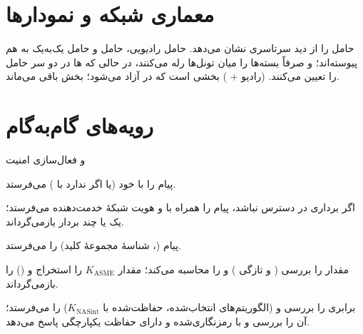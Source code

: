 \documentclass[11pt,a4paper]{article}
\begin{document}
\section{معماری شبکه و نمودارها}
 حامل را از دید سرتاسری نشان می‌دهد. حامل رادیویی، حامل  و حامل  یک‌به‌یک به هم
پیوسته‌اند؛  و  صرفاً بسته‌ها را میان تونل‌ها رله می‌کنند، در حالی که ها در دو سر حامل را تعیین
می‌کنند.  (رادیو + ) بخشی است که در  آزاد می‌شود؛ بخش  باقی می‌ماند.

\begin{acnfigure}
  \caption{ساختار حامل  با یک حامل پیش‌فرض و یک حامل اختصاصی.  در  و  در
   جریان‌های  را به حامل‌ها نگاشت می‌کنند.}
  \label{fig:bearer}
\end{acnfigure}

\begin{acnfigure}
  \caption{سلسله‌مراتب کلید . طول کلیدها بر حسب بیت؛ کلیدهای الگوریتم به ۱۲۸ بیت کوتاه می‌شوند.}
  \label{fig:keys}
\end{acnfigure}

\section{رویه‌های گام‌به‌گام}

\begin{procedurebox}{ و فعال‌سازی امنیت }\label{proc:aka}
\begin{steps}
  \item {} پیام  را با  خود (یا اگر ندارد با ) می‌فرستد.
  \item اگر برداری در دسترس نباشد،  پیام   را همراه با 
        و هویت شبکهٔ خدمت‌دهنده می‌فرستد؛  یک یا چند بردار  بازمی‌گرداند.
  \item {} پیام  (، شناسهٔ مجموعهٔ کلید) را می‌فرستد.
  \item {} مقدار  را بررسی ( و تازگی ) و  را محاسبه می‌کند؛ 
        مقدار $K_{\mathrm{ASME}}$ را استخراج و  () را بازمی‌گرداند.
  \item {} برابری  را بررسی و  (الگوریتم‌های انتخاب‌شده، حفاظت‌شده با
        $K_{\mathrm{NASint}}$) را می‌فرستد؛  آن را بررسی و با  رمزنگاری‌شده و دارای
        حفاظت یکپارچگی پاسخ می‌دهد.
\end{steps}
\end{procedurebox}
\end{document}
